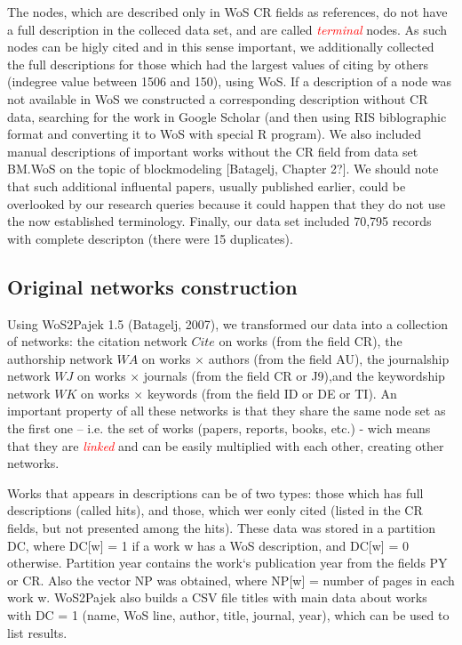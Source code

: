 \documentclass[11pt]{article} %
\newcommand{\keyw}[1]{\textcolor{red}{\emph{#1}}}
\begin{document}
The nodes, which are described only in WoS CR fields as references, do not have a full description in the colleced data set, and are called \keyw{terminal} nodes. As such nodes can be higly cited and in this sense important, we additionally collected the full descriptions for those which had the  largest values of citing by others (indegree value between 1506 and 150), using WoS. If a description of a node was not available in WoS we constructed a corresponding description without CR data, searching for the work in Google Scholar (and then using RIS biblographic format and converting it to WoS with special R program). We also included manual descriptions of important works without the CR field from data set BM.WoS on the topic of blockmodeling [Batagelj, Chapter 2?]. We should note that such additional influental papers, usually published earlier, could be overlooked by our research queries because it could happen that they do not use the now established terminology. Finally, our data set included 70,795 records with complete descripton (there were 15 duplicates).  \medskip

\subsection{Original networks construction}

Using WoS2Pajek 1.5  (Batagelj, 2007), we transformed our data into a collection of networks: the citation network $Cite$ on works (from the field CR), the authorship network $WA$ on works $\times$ authors  (from the field AU),  the journalship network $WJ$ on  works $\times$ journals  (from the field CR or J9),and the keywordship network $WK$ on works  $\times$ keywords (from the field ID or DE or TI). An important property of all these networks is that they share the same node set as the first one – i.e. the set of works (papers, reports, books, etc.) - wich means that they are \keyw{linked} and can be easily multiplied with each other, creating other networks. \medskip

Works that appears in descriptions can be of two types: those which has full descriptions (called hits), and those, which wer eonly cited (listed in the CR fields, but not presented among the hits). These data was stored in a partition DC, where DC[w] = 1 if a work w has a WoS description, and DC[w] = 0 otherwise. Partition year contains the work`s publication year from the fields PY or CR. Also the vector NP was obtained, where NP[w] = number of pages in each work w. WoS2Pajek also builds a CSV file titles with main data about works with DC = 1 (name, WoS line, author, title, journal, year), which can be used to list results. \medskip 
\end{document}
